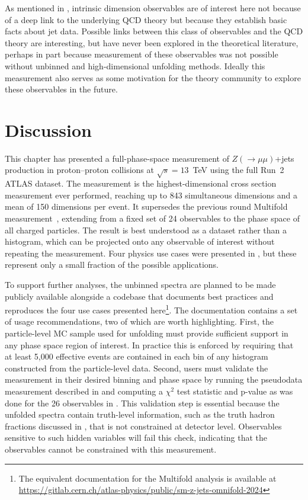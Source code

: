 As mentioned in , intrinsic dimension observables are of interest here not because of a deep link to the underlying QCD theory but because they establish basic facts about jet data.
Possible links between this class of observables and the QCD theory are interesting, but have never been explored in the theoretical literature, perhaps in part because measurement of these observables was not possible without unbinned and high-dimensional unfolding methods.
Ideally this measurement also serves as some motivation for the theory community to explore these observables in the future.

\section{Discussion}
\label{sec:zjets-discussion}

This chapter has presented a full-phase-space measurement of $Z(\to\mu\mu)$+jets production in proton--proton collisions at $\sqrt{s} = 13$~TeV using the full Run~2 ATLAS dataset.
The measurement is the highest-dimensional cross section measurement ever performed, reaching up to 843 simultaneous dimensions and a mean of 150 dimensions per event.
It supersedes the previous round Multifold measurement~\cite{ATLAS:2024xxl}, extending from a fixed set of 24 observables to the phase space of all charged particles.
The result is best understood as a dataset rather than a histogram, which can be projected onto any observable of interest without repeating the measurement.
Four physics use cases were presented in , but these represent only a small fraction of the possible applications.

To support further analyses, the unbinned spectra are planned to be made publicly available alongside a codebase that documents best practices and reproduces the four use cases presented here\footnote{The equivalent documentation for the Multifold analysis is available at \href{https://gitlab.cern.ch/atlas-physics/public/sm-z-jets-omnifold-2024}{https://gitlab.cern.ch/atlas-physics/public/sm-z-jets-omnifold-2024}}.
The documentation contains a set of usage recommendations, two of which are worth highlighting.
First, the particle-level MC sample used for unfolding must provide sufficient support in any phase space region of interest.
In practice this is enforced by requiring that at least 5,000 effective events are contained in each bin of any histogram constructed from the particle-level data.
Second, users must validate the measurement in their desired binning and phase space by running the pseudodata measurement described in  and computing a $\chi^2$ test statistic and p-value as was done for the 26 observables in .
This validation step is essential because the unfolded spectra contain truth-level information, such as the truth hadron fractions discussed in , that is not constrained at detector level.
Observables sensitive to such hidden variables will fail this check, indicating that the observables cannot be constrained with this measurement.

